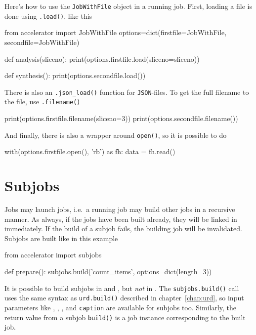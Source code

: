 Here's how to use the \texttt{JobWithFile} object in a running job.
First, loading a file is done using \texttt{.load()}, like this
\begin{python}
from accelerator import JobWithFile
options=dict(firstfile=JobWithFile, secondfile=JobWithFile)

def analysis(sliceno):
    print(options.firstfile.load(sliceno=sliceno))

def synthesis():
    print(options.secondfile.load())
\end{python}
There is also an \texttt{.json\_load()} function
for \texttt{JSON}-files.  To get the full filename to the file,
use \texttt{.filename()}
\begin{python}
    print(options.firstfile.filename(sliceno=3))
    print(options.secondfile.filename())
\end{python}
And finally, there is also a wrapper around \texttt{open()}, so it is
possible to do
\begin{python}
    with(options.firstfile.open(), 'rb') as fh:
        data = fh.read()
\end{python}
        

\section{Subjobs}
\label{sec:subjobs}
Jobs may launch jobs, i.e.\ a running job may build other jobs in a
recursive manner.  As always, if the jobs have been built already,
they will be linked in immediately.  If the build of a subjob fails,
the building job will be invalidated.  Subjobs are built like in this
example
\begin{python}
from accelerator import subjobs

def prepare():
    subjobs.build('count_items', options=dict(length=3))
\end{python}
It is possible to build subjobs in \prepare and \synthesis, but \textsl{not} in
\analysis.  The \texttt{subjobs.build()} call uses the same syntax as
\texttt{urd.build()} described in chapter~\ref{chap:urd}, so input
parameters like \options, \datasets, \jobs, and \texttt{caption} are
available for subjobs too.  Similarly, the return value from a subjob
\texttt{build()} is a job instance corresponding to the built job.

